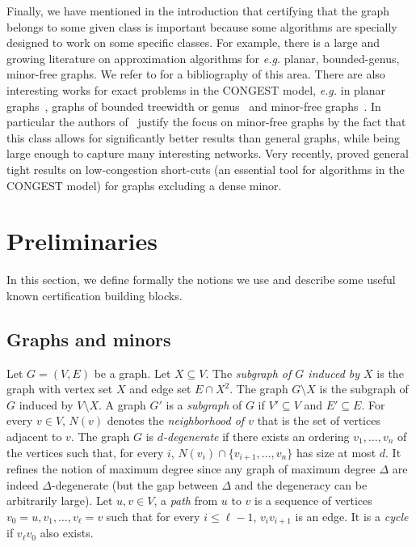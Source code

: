 \documentclass[a4paper,thm-restate,USenglish]{lipics-v2019}
\begin{document}
Finally, we have mentioned in the introduction that certifying that the graph belongs to some given class is important because some algorithms are specially designed to work on some specific classes. 
For example, there is a large and growing literature on approximation algorithms for \emph{e.g.} planar, bounded-genus, minor-free graphs. We refer to \cite{Feuilloley20} for a bibliography of this area.
There are also interesting works for exact problems in the CONGEST model, \emph{e.g.} in planar graphs~\cite{GhaffariH16}, graphs of bounded treewidth or genus~\cite{HaeuplerIZ16} and minor-free graphs~\cite{HaeuplerLZ18}. In particular the authors of~\cite{HaeuplerLZ18} justify the focus on minor-free graphs by the fact that this class allows for significantly better results than general graphs, while being large enough to capture many interesting networks. 
Very recently, \cite{GhaffariH21} proved general tight results on low-congestion short-cuts (an essential tool for algorithms in the CONGEST model) for graphs excluding a dense minor.

\section{Preliminaries}
\label{sec:preliminaries}

In this section, we define formally the notions we use and describe some useful known certification building blocks.

\subsection{Graphs and minors}

Let $G=(V,E)$ be a graph. 
Let $X \subseteq V$. The \emph{subgraph of $G$ induced by $X$} is the graph with vertex set $X$ and edge set $E \cap X^2$. The graph $G \setminus X$ is the subgraph of $G$ induced by $V \setminus X$. A graph $G'$ is a \emph{subgraph} of $G$ if $V' \subseteq V$ and $E' \subseteq E$.
For every $v \in V$, $N(v)$ denotes the \emph{neighborhood of $v$} that is the set of vertices adjacent to $v$. The graph $G$ is \emph{$d$-degenerate} if there exists an ordering $v_1,\ldots,v_n$ of the vertices such that, for every $i$, $N(v_i) \cap \{ v_{i+1},\ldots,v_n \}$ has size at most $d$. It refines the notion of maximum degree since any graph of maximum degree $\Delta$ are indeed $\Delta$-degenerate (but the gap between $\Delta$ and the degeneracy can be arbitrarily large). 
Let $u,v \in V$, a \emph{path} from $u$ to $v$ is a sequence of vertices $v_0=u,v_1,\ldots,v_\ell=v$ such that for every $i \le \ell-1$, $v_iv_{i+1}$ is an edge. It is a \emph{cycle} if $v_\ell v_0$ also exists.
\end{document}
